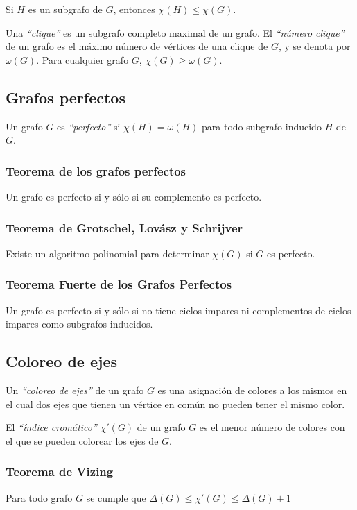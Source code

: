 Si $H$ es un subgrafo de $G$, entonces $\chi(H) \leq \chi(G)$.

Una \emph{``clique''} es un subgrafo completo maximal de un grafo. El \emph{``n\'umero clique''} de un grafo es el m\'aximo n\'umero de v\'ertices de una clique de $G$, y se denota por $\omega(G)$. Para cualquier grafo $G$, $\chi(G) \geq \omega(G)$.

\subsection{Grafos perfectos}

Un grafo $G$ es \emph{``perfecto''} si $\chi(H) = \omega(H)$ para todo subgrafo inducido $H$ de $G$.

\subsubsection{Teorema de los grafos perfectos}

Un grafo es perfecto si y s\'olo si su complemento es perfecto.

\subsubsection{Teorema de Grotschel, Lov\'asz y Schrijver}

Existe un algoritmo polinomial para determinar $\chi(G)$ si $G$ es perfecto.

\subsubsection{Teorema Fuerte de los Grafos Perfectos}

Un grafo es perfecto si y s\'olo si no tiene ciclos impares ni complementos de ciclos impares como subgrafos inducidos.


\newpage
\subsection{Coloreo de ejes}

Un \emph{``coloreo de ejes''} de un grafo $G$ es una asignaci\'on de colores a los mismos en el cual dos ejes que tienen un v\'ertice en com\'un no pueden tener el mismo color.

El \emph{``\'indice crom\'atico''} $\chi'(G)$ de un grafo $G$ es el menor n\'umero de colores con el que se pueden colorear los ejes de $G$.

\subsubsection{Teorema de Vizing}

Para todo grafo $G$ se cumple que $\Delta(G) \leq \chi'(G) \leq \Delta(G) + 1$